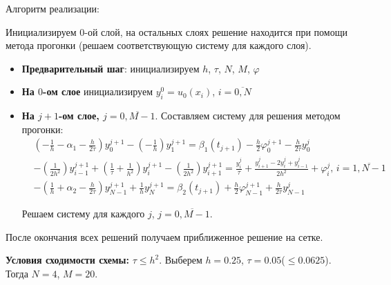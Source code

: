 Алгоритм реализации:\par
Инициализируем $0$-ой слой, на остальных слоях решение находится при помощи метода прогонки (решаем соответствующую систему для каждого слоя).
\begin{itemize}
\item \textbf{Предварительный шаг}: инициализируем $h$, $\tau$, $N$, $M$, $\varphi$
\item \textbf{На $0$-ом слое} инициализируем $y_{i}^{0} = u_{0}(x_{i})$, $i=\overline{0,N}$
\item { \textbf{На $j+1$-ом слое, $j=\overline{0,M-1}$}. Составляем систему для решения методом прогонки:
\begin{eqnarray*}
& (-\frac{1}{h}-\alpha_{1}-\frac{h}{2\tau})y_{0}^{j+1} - (-\frac{1}{h})y_{1}^{j+1} = \beta_{1}(t_{j+1}) -\frac{h}{2}\varphi_{0}^{j+1} -\frac{h}{2\tau}y_{0}^{j} \\
& -(\frac{1}{2h^{2}})y_{i-1}^{j+1} + (\frac{1}{\tau} + \frac{1}{h^{2}})y_{i}^{j+1} -(\frac{1}{2h^{2}})y_{i+1}^{j+1} = \frac{y_{i}^{j}}{\tau} + \frac{y_{i+1}^{j} - 2y_{i}^{j} + y_{i-1}^{j}}{2h^{2}} + \varphi_{i}^{j}\text{, }i=\overline{1,N-1} \\
& -(\frac{1}{h}+\alpha_{2}-\frac{h}{2\tau})y_{N-1}^{j+1} + \frac{1}{h}y_{N}^{j+1} = \beta_{2}(t_{j+1}) + \frac{h}{2}\varphi_{N-1}^{j+1} + \frac{h}{2\tau}y_{N-1}^{j}
\end{eqnarray*}\par
Решаем систему для каждого $j$, $j=\overline{0,M-1}$.
}
\end{itemize} \par
После окончания всех решений получаем приближенное решение на сетке. \par
\textbf{Условия сходимости схемы:} $\tau \le h^{2}$. Выберем $h=0.25$, $\tau=0.05$($\le 0.0625$). Тогда $N=4$, $M=20$. \par

